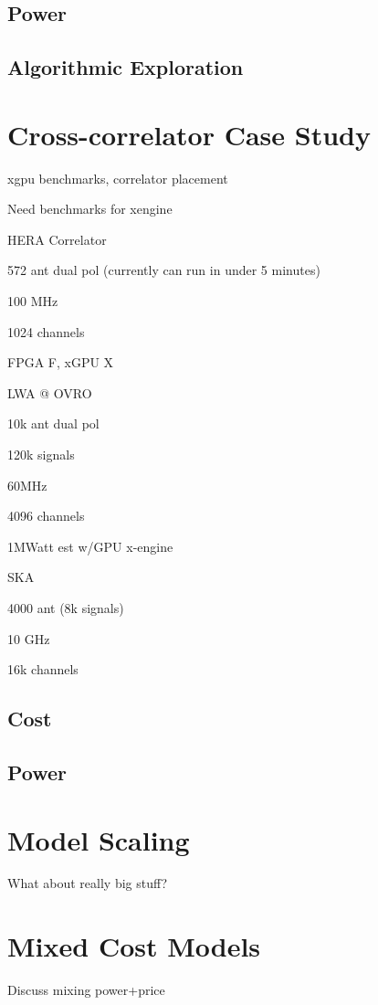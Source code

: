 \subsection{Power}
\subsection{Algorithmic Exploration}

\section{Cross-correlator Case Study}
xgpu benchmarks, correlator placement

Need benchmarks for xengine

HERA Correlator

572 ant dual pol (currently can run in under 5 minutes)

100 MHz

1024 channels

FPGA F, xGPU X

LWA @ OVRO

10k ant dual pol

120k signals

60MHz

4096 channels

1MWatt est w/GPU x-engine

SKA

4000 ant (8k signals)

10 GHz

16k channels




\subsection{Cost}
\subsection{Power}

\section{Model Scaling}
What about really big stuff?

\section{Mixed Cost Models}
Discuss mixing power+price
